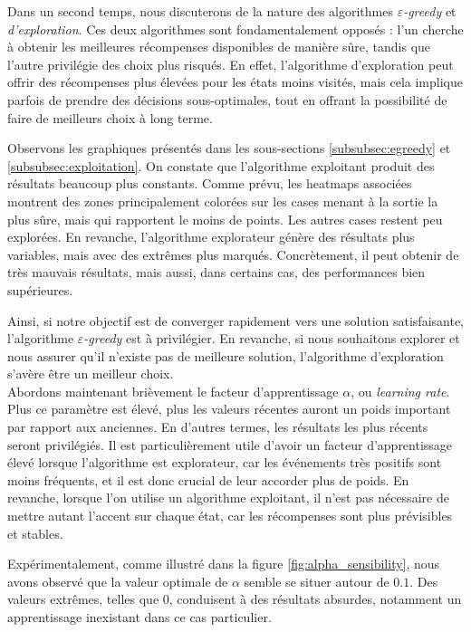 \documentclass{article}
\begin{document}
\noindent Dans un second temps, nous discuterons de la nature des algorithmes \textit{$\varepsilon$-greedy} et \textit{d'exploration}. Ces deux algorithmes sont fondamentalement opposés : l'un cherche à obtenir les meilleures récompenses disponibles de manière sûre, tandis que l'autre privilégie des choix plus risqués. En effet, l'algorithme d'exploration peut offrir des récompenses plus élevées pour les états moins visités, mais cela implique parfois de prendre des décisions sous-optimales, tout en offrant la possibilité de faire de meilleurs choix à long terme.

\noindent Observons les graphiques présentés dans les sous-sections \ref{subsubsec:egreedy} et \ref{subsubsec:exploitation}. On constate que l'algorithme exploitant produit des résultats beaucoup plus constants. Comme prévu, les heatmaps associées montrent des zones principalement colorées sur les cases menant à la sortie la plus sûre, mais qui rapportent le moins de points. Les autres cases restent peu explorées. En revanche, l'algorithme explorateur génère des résultats plus variables, mais avec des extrêmes plus marqués. Concrètement, il peut obtenir de très mauvais résultats, mais aussi, dans certains cas, des performances bien supérieures.

\noindent Ainsi, si notre objectif est de converger rapidement vers une solution satisfaisante, l'algorithme \textit{$\varepsilon$-greedy} est à privilégier. En revanche, si nous souhaitons explorer et nous assurer qu'il n'existe pas de meilleure solution, l'algorithme d'exploration s'avère être un meilleur choix. \\

\noindent Abordons maintenant brièvement le facteur d'apprentissage $\alpha$, ou \textit{learning rate}. Plus ce paramètre est élevé, plus les valeurs récentes auront un poids important par rapport aux anciennes. En d'autres termes, les résultats les plus récents seront privilégiés. Il est particulièrement utile d'avoir un facteur d'apprentissage élevé lorsque l'algorithme est explorateur, car les événements très positifs sont moins fréquents, et il est donc crucial de leur accorder plus de poids. En revanche, lorsque l'on utilise un algorithme exploitant, il n'est pas nécessaire de mettre autant l'accent sur chaque état, car les récompenses sont plus prévisibles et stables.

\noindent Expérimentalement, comme illustré dans la figure \ref{fig:alpha_sensibility}, nous avons observé que la valeur optimale de $\alpha$ semble se situer autour de $0.1$. Des valeurs extrêmes, telles que $0$, conduisent à des résultats absurdes, notamment un apprentissage inexistant dans ce cas particulier. \\
\end{document}
